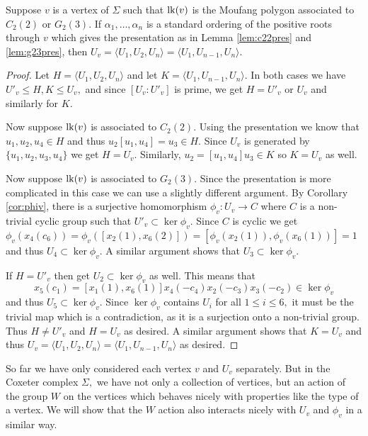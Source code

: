 \documentclass[class=book, crop=false,12 pt]{standalone}
\begin{document}
\begin{lemma}
	\label{lem:generators}
	Suppose $v$ is a vertex of $\Sigma$ such that $\mathrm{lk}(v)$ is the Moufang polygon associated to $C_2(2)$ or $G_2(3).$ If $\alpha_1,\dots,\alpha_n$ is a standard ordering of the positive roots through $v$ which gives the presentation as in Lemma \ref{lem:c22pres} and \ref{lem:g23pres}, then $U_v=\langle U_1,U_2,U_n\rangle=\langle U_1,U_{n-1},U_n\rangle.$
\end{lemma}
\begin{proof}
	Let $H=\langle U_1,U_{2},U_n\rangle$ and let $K=\langle U_1,U_{n-1},U_n\rangle.$ In both cases we have $U'_v\le H,K\le U_v,$ and since $[U_v:U'_v]$ is prime, we get $H=U'_v$ or $U_v$ and similarly for $K.$

	Now suppose $\mathrm{lk}(v)$ is associated to $C_2(2).$ Using the presentation we know that $u_1,u_2,u_4\in H$ and thus $u_2[u_1,u_4]=u_3\in H.$ Since $U_v$ is generated by $\{u_1,u_2,u_3,u_4\}$ we get $H=U_v.$ Similarly, $u_2=[u_1,u_4]u_3\in K$ so $K=U_v$ as well.

	Now suppose $\mathrm{lk}(v)$ is associated to $G_2(3).$ Since the presentation is more complicated in this case we can use a slightly different argument. By Corollary \ref{cor:phiv}, there is a surjective homomorphism $\phi_v:U_v\to C$ where $C$ is a non-trivial cyclic group such that $U'_v\subset \ker \phi_v.$ Since $C$ is cyclic we get $\phi_v(x_4(c_6))=\phi_v([x_2(1),x_6(2)])=[\phi_v(x_2(1)),\phi_v(x_6(1))]=1$ and thus $U_4\subset \ker \phi_v.$ A similar argument shows that $U_3\subset \ker \phi_v.$

	If $H=U'_v$ then get $U_2\subset \ker \phi_v$ as well. This means that \[x_5(c_1)=[x_1(1),x_6(1)]x_4(-c_4)x_2(-c_3)x_3(-c_2)\in \ker \phi_v\] and thus $U_5\subset \ker \phi_v.$ Since $\ker \phi_v$ contains $U_i$ for all $1\le i\le 6,$ it must be the trivial map which is a contradiction, as it is a surjection onto a non-trivial group. Thus $H\neq U'_v$ and $H=U_v$ as desired. A similar argument shows that $K=U_v$ and thus $U_v=\langle U_1,U_2,U_n\rangle=\langle U_1,U_{n-1},U_n\rangle$ as desired.
\end{proof}

So far we have only considered each vertex $v$ and $U_v$ separately. But in the Coxeter complex $\Sigma,$ we have not only a collection of vertices, but an action of the group $W$ on the vertices which behaves nicely with properties like the type of a vertex. We will show that the $W$ action also interacts nicely with $U_v$ and $\phi_v$ in a similar way.
\end{document}
